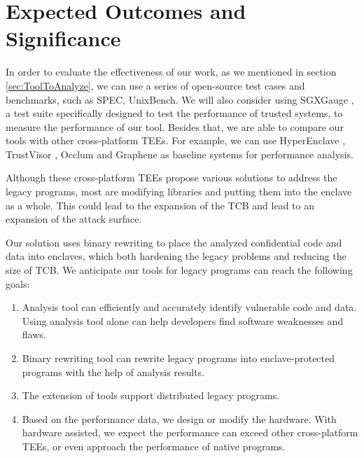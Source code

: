 \section{Expected Outcomes and Significance}
In order to evaluate the effectiveness of our work, as we mentioned in section
\ref{sec:ToolToAnalyze}, we can use a series of open-source test cases and benchmarks,
such as SPEC, UnixBench. 
We will also consider using SGXGauge \cite{Kumar2022ACB}, a test suite specifically
designed to test the performance of trusted systems, to measure the performance
of our tool.
Besides that, we are able to compare our tools with other cross-platform TEEs.
For example, we can use HyperEnclave \cite{Jia2022HyperEnclaveAO}, TrustVisor
\cite{McCune2010TrustVisorET}, Occlum \cite{Shen2020OcclumSA} and Graphene
\cite{Tsai2017GrapheneSGXAP} as baseline systems for performance analysis.

Although these cross-platform TEEs propose various solutions to address the
legacy programs, most are modifying libraries and putting them into the
enclave as a whole. This could lead to the expansion of the TCB and lead
to an expansion of the attack surface.

Our solution uses binary rewriting to place the analyzed confidential code and data
into enclaves, which both hardening the legacy problems and reducing the size of TCB.
We anticipate our tools for legacy programs can reach the following goals:
\begin{enumerate}
    \item Analysis tool can efficiently and accurately identify vulnerable code and data.
    Using analysis tool alone can help developers find software weaknesses and flaws.
    \item Binary rewriting tool can rewrite legacy programs into enclave-protected programs
    with the help of analysis results.
    \item The extension of tools support distributed legacy programs.
    \item Based on the performance data, we design or modify the hardware.
    With hardware assisted, we expect the performance can exceed other cross-platform TEEs,
    or even approach the performance of native programs.
\end{enumerate}